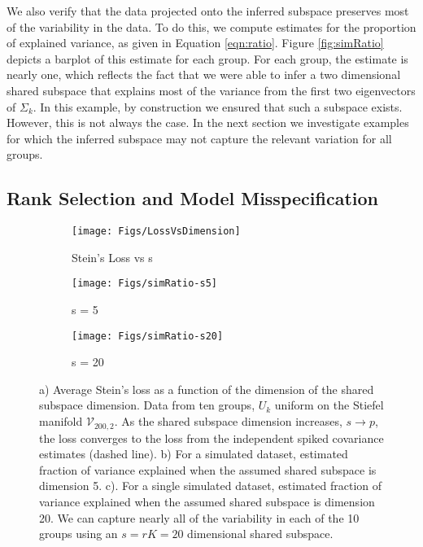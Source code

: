 \documentclass{article}
\begin{document}
We also verify that the data projected onto the inferred subspace
preserves most of the variability in the data.  To do this, we compute
estimates for the proportion of explained variance, as given in
Equation \ref{eqn:ratio}.  Figure \ref{fig:simRatio} depicts a barplot
of this estimate for each group.  For each group, the estimate is
nearly one, which reflects the fact that we were able to infer a two
dimensional shared subspace that explains most of the variance from
the first two eigenvectors of $\Sigma_k$.  In this example, by
construction we ensured that such a subspace exists. However, this is
not always the case.  In the next section we investigate examples for
which the inferred subspace may not capture the relevant variation for
all groups.

\subsection{Rank Selection and Model Misspecification}

\begin{figure}[t]
    \centering
    \begin{subfigure}[b]{0.3\textwidth}
        \texttt{[image: Figs/LossVsDimension]}
        \caption{Stein's Loss vs s}
        \label{fig:sdimension}
    \end{subfigure}
    \begin{subfigure}[b]{0.3\textwidth}
        \texttt{[image: Figs/simRatio-s5]}
        \caption{s = 5}
        \label{fig:ratio-s5}
    \end{subfigure}
    \begin{subfigure}[b]{0.3\textwidth}
        \texttt{[image: Figs/simRatio-s20]}
        \caption{s = 20}
        \label{fig:ratio-s20}
    \end{subfigure}
    \caption{a) Average Stein's loss as a function of the dimension of
      the shared subspace dimension.  Data from ten groups, $U_k$
      uniform on the Stiefel manifold $\mathcal{V}_{200, 2}$.  As the
      shared subspace dimension increases, $s \rightarrow p$, the loss
      converges to the loss from the independent spiked covariance
      estimates (dashed line). b) For a simulated dataset, estimated
      fraction of variance explained when the assumed shared subspace
      is dimension 5.  c).  For a single simulated dataset, estimated
      fraction of variance explained when the assumed shared subspace
      is dimension 20.  We can capture nearly all of the variability
      in each of the 10 groups using an $s=rK=20$ dimensional shared
      subspace. }
\label{fig:dimensionPlots}
\end{figure}
\end{document}
